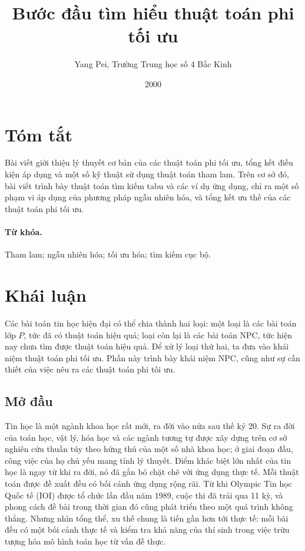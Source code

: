 \documentclass[11pt]{article}
\title{Bước đầu tìm hiểu thuật toán phi tối ưu}
\author{Yang Pei, Trường Trung học số 4 Bắc Kinh}
\date{2000}
\begin{document}
\maketitle


\section*{Tóm tắt}

Bài viết giới thiệu lý thuyết cơ bản của các thuật toán phi tối ưu, tổng kết
điều kiện áp dụng và một số kỹ thuật sử dụng thuật toán tham lam. Trên cơ sở
đó, bài viết trình bày thuật toán tìm kiếm tabu và các ví dụ ứng dụng, chỉ ra
một số phạm vi áp dụng của phương pháp ngẫu nhiên hóa, và tổng kết ưu thế của
các thuật toán phi tối ưu.

\paragraph{Từ khóa.}
Tham lam; ngẫu nhiên hóa; tối ưu hóa; tìm kiếm cục bộ.

\section{Khái luận}

Các bài toán tin học hiện đại có thể chia thành hai loại: một loại là các bài
toán lớp \(P\), tức đã có thuật toán hiệu quả; loại còn lại là các bài toán
NPC, tức hiện nay chưa tìm được thuật toán hiệu quả. Để xử lý loại thứ hai,
ta đưa vào khái niệm thuật toán phi tối ưu. Phần này trình bày khái niệm NPC,
cũng như sự cần thiết của việc nêu ra các thuật toán phi tối ưu.

\subsection{Mở đầu}

Tin học là một ngành khoa học rất mới, ra đời vào nửa sau thế kỷ 20. Sự ra đời
của toán học, vật lý, hóa học và các ngành tương tự được xây dựng trên cơ sở
nghiên cứu thuần túy theo hứng thú của một số nhà khoa học; ở giai đoạn đầu,
công việc của họ chủ yếu mang tính lý thuyết. Điểm khác biệt lớn nhất của tin
học là ngay từ khi ra đời, nó đã gắn bó chặt chẽ với ứng dụng thực tế. Mỗi
thuật toán được đề xuất đều có bối cảnh ứng dụng rộng rãi. Từ khi Olympic Tin
học Quốc tế (IOI) được tổ chức lần đầu năm 1989, cuộc thi đã trải qua 11 kỳ,
và phong cách đề bài trong thời gian đó cũng phát triển theo một quá trình
không thẳng. Nhưng nhìn tổng thể, xu thế chung là tiến gần hơn tới thực tế:
mỗi bài đều có một bối cảnh thực tế và kiểm tra khả năng của thí sinh trong
việc trừu tượng hóa mô hình toán học từ vấn đề thực.
\end{document}
